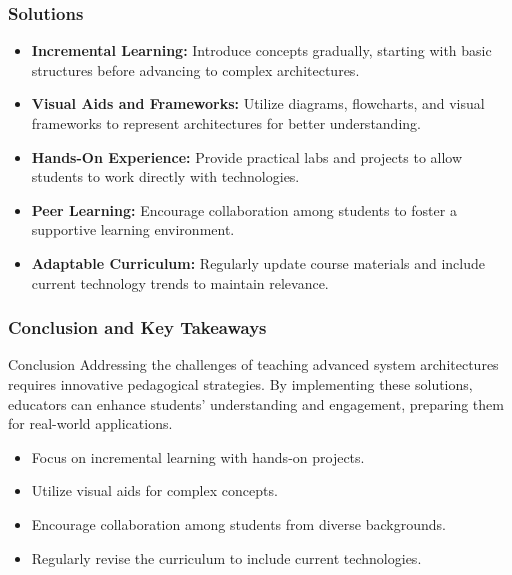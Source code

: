 \documentclass[aspectratio=169]{beamer}
\begin{document}
\begin{frame}[fragile]
    \frametitle{Solutions}
    \begin{itemize}
        \item \textbf{Incremental Learning:} 
        Introduce concepts gradually, starting with basic structures before advancing to complex architectures.
        \item \textbf{Visual Aids and Frameworks:} 
        Utilize diagrams, flowcharts, and visual frameworks to represent architectures for better understanding.
        \item \textbf{Hands-On Experience:} 
        Provide practical labs and projects to allow students to work directly with technologies.
        \item \textbf{Peer Learning:} 
        Encourage collaboration among students to foster a supportive learning environment.
        \item \textbf{Adaptable Curriculum:}
        Regularly update course materials and include current technology trends to maintain relevance.
    \end{itemize}
\end{frame}

\begin{frame}[fragile]
    \frametitle{Conclusion and Key Takeaways}
    \begin{block}{Conclusion}
        Addressing the challenges of teaching advanced system architectures requires innovative pedagogical strategies. By implementing these solutions, educators can enhance students' understanding and engagement, preparing them for real-world applications.
    \end{block}
    \begin{itemize}
        \item Focus on incremental learning with hands-on projects.
        \item Utilize visual aids for complex concepts.
        \item Encourage collaboration among students from diverse backgrounds.
        \item Regularly revise the curriculum to include current technologies.
    \end{itemize}
\end{frame}
\end{document}
